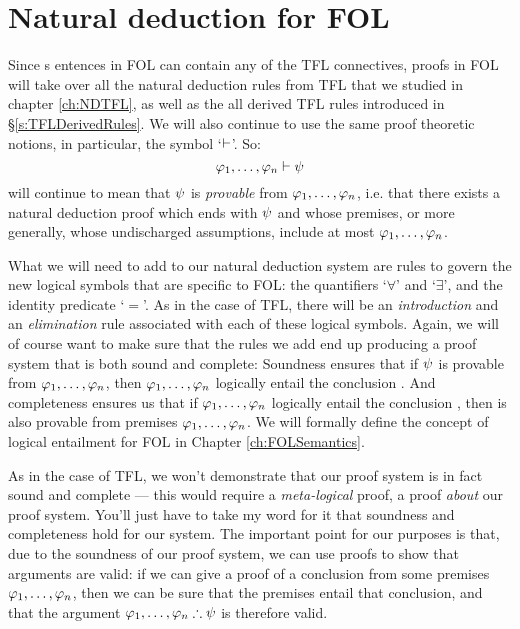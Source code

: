 \chapter{Natural deduction for FOL}\label{ch:NDFOL}


Since s entences in FOL can contain any of the TFL connectives, proofs in FOL will take over all the natural deduction rules from TFL that we studied in chapter \ref{ch:NDTFL}, as well as the all derived  TFL rules introduced in \S \ref{s:TFLDerivedRules}.  We will also continue to use the same proof theoretic notions, in particular, the symbol `$\vdash$'.  So:
$$\mathcal{\varphi}_1, \ldots, \mathcal{\varphi}_n \vdash \mathcal{\psi}$$
will continue to mean that $\mathcal{\psi}$ is \emph{provable} from $\mathcal{\varphi}_1, \ldots, \mathcal{\varphi}_n$, i.e. that there exists a natural deduction proof which ends with $\mathcal{\psi}$ and whose premises, or more generally, whose undischarged assumptions, include at most $\mathcal{\varphi}_1, \ldots, \mathcal{\varphi}_n$.


What we will need to add to our natural deduction system are rules to govern the new logical symbols that are specific to FOL: the quantifiers `$\forall$' and `$\exists$', and the identity predicate `$=$'.  As in the case of TFL, there will be an \emph{introduction} and an \emph{elimination} rule associated with each of these logical symbols.  Again, we will of course want to make sure that the rules we add end up producing a proof system that is both sound and complete:
Soundness ensures that if $\mathcal{\psi}$ is provable from $\mathcal{\varphi}_1, \ldots, \mathcal{\varphi}_n$, then $\mathcal{\varphi}_1, \ldots, \mathcal{\varphi}_n$ logically entail the conclusion \meta{\psi}.  And completeness ensures us that if $\mathcal{\varphi}_1, \ldots, \mathcal{\varphi}_n$ logically entail the conclusion \meta{\psi}, then \meta{\psi} is also provable from premises $\mathcal{\varphi}_1, \ldots, \mathcal{\varphi}_n$.  We will formally define the concept of logical entailment  for FOL in Chapter \ref{ch:FOLSemantics}.

As in the case of TFL, we won't demonstrate that our proof system is in fact sound and complete --- this would require a \emph{meta-logical} proof, a proof \emph{about} our proof system.  You'll just have to take my word for it that soundness and completeness hold for our system. The important point for our purposes is that, due to the soundness of our proof system, we can use proofs to show that arguments are valid: if we can give a proof of a conclusion \meta{\psi} from some premises $\mathcal{\varphi}_1, \ldots, \mathcal{\varphi}_n$, then we can be sure that the premises entail that conclusion, and that the argument $\mathcal{\varphi}_1, \ldots, \mathcal{\varphi}_n \therefore \mathcal{\psi}$ is therefore valid.


